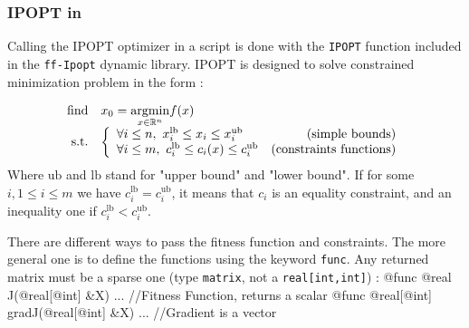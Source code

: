 \documentclass[a4paper,twoside,12pt]{book}
\begin{document}
\subsubsection{IPOPT in \freefempp}
Calling the IPOPT optimizer in a \freefempp script is done with the {\tt IPOPT} function included in the {\tt ff-Ipopt} dynamic library. IPOPT is designed to solve constrained minimization problem in the form :

 \begin{equation}\label{ipoptproblem}
 \begin{array} {r l}
 	\mathrm{find}& x_{0} = \underset{x\in\R^{n}}{\operatorname{argmin}} f(x) \\
 	\mathrm{s.t.}&\left\lbrace \begin{array}{l r}  \forall i\leq n,\ x_{i}^{\mathrm{lb}}\leq x_{i}\leq x_{i}^{\mathrm{ub}} & \mathrm{\  (simple\ bounds)} \\
	   \forall i\leq m,\ c_{i}^{\mathrm{lb}}\leq c_{i}(x)\leq c_{i}^{\mathrm{ub}} & \mathrm{(constraints\ functions)}
 \end{array}\right. \\
 
 \end{array}
 \end{equation}
Where $\mathrm{ub}$ and $\mathrm{lb}$ stand for "upper bound" and "lower bound". If for some $i, 1\leq i\leq m$ we have $c_{i}^{\mathrm{lb}} = c_{i}^{\mathrm{ub}}$, it means that $c_{i}$ is an equality constraint, and an inequality one if $c_{i}^{\mathrm{lb}} < c_{i}^{\mathrm{ub}}$.


There are different ways to pass the fitness function and constraints. The more general one is to define the functions using the keyword {\tt func}. Any returned matrix must be a sparse one (type {\tt matrix}, not a {\tt real[int,int]}) :
\bFF
  @func @real J(@real[@int] &X) {...} //Fitness Function, returns a scalar
  @func @real[@int] gradJ(@real[@int] &X) {...} //Gradient is a vector
  
\end{document}
